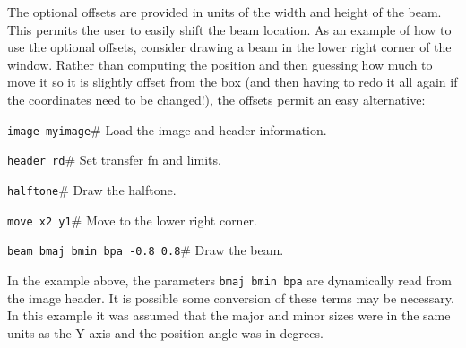 The optional offsets are provided in units of the width and height of the beam.
This permits the user to easily shift the beam location.
As an example of how to use the optional offsets, consider drawing
a beam in the lower right corner of the window.
Rather than computing the position and then guessing how much to move it
so it is slightly offset from the box (and then having to redo it all
again if the coordinates need to be changed!), the offsets permit an
easy alternative:
\begin{wiplist}%
  \item {\tt image myimage}\hfill\# Load the image and header information.
\samepage
  \item {\tt header rd}\hfill\# Set transfer fn and limits.
  \item {\tt halftone}\hfill\# Draw the halftone.
  \item {\tt move x2 y1}\hfill\# Move to the lower right corner.
  \item {\tt beam bmaj bmin bpa -0.8 0.8}\hfill\# Draw the beam.
\end{wiplist}
In the example above, the parameters {\tt bmaj bmin bpa} are dynamically
read from the image header.
It is possible some conversion of these terms may be necessary.
In this example it was assumed
that the major and minor sizes were in the same units as the Y-axis and
the position angle was in degrees.
